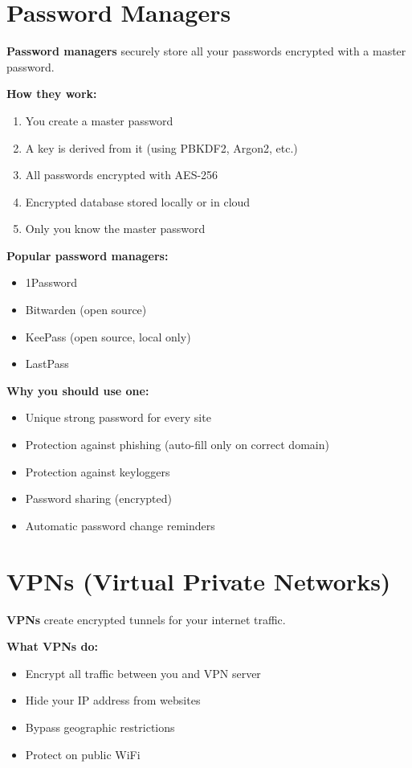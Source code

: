 \documentclass[11pt,a4paper]{report}
\begin{document}
\section{Password Managers}

\textbf{Password managers} securely store all your passwords encrypted with a master password.

\textbf{How they work:}
\begin{enumerate}
\item You create a master password
\item A key is derived from it (using PBKDF2, Argon2, etc.)
\item All passwords encrypted with AES-256
\item Encrypted database stored locally or in cloud
\item Only you know the master password
\end{enumerate}

\textbf{Popular password managers:}
\begin{itemize}
\item 1Password
\item Bitwarden (open source)
\item KeePass (open source, local only)
\item LastPass
\end{itemize}

\textbf{Why you should use one:}
\begin{itemize}
\item Unique strong password for every site
\item Protection against phishing (auto-fill only on correct domain)
\item Protection against keyloggers
\item Password sharing (encrypted)
\item Automatic password change reminders
\end{itemize}

\section{VPNs (Virtual Private Networks)}

\textbf{VPNs} create encrypted tunnels for your internet traffic.

\textbf{What VPNs do:}
\begin{itemize}
\item Encrypt all traffic between you and VPN server
\item Hide your IP address from websites
\item Bypass geographic restrictions
\item Protect on public WiFi
\end{itemize}
\end{document}

